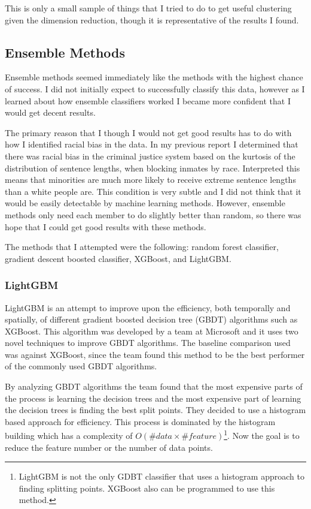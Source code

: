 \documentclass[11pt]{article}
\begin{document}
    
    This is only a small sample of things that I tried to do to get useful
clustering given the dimension reduction, though it is representative
of the results I found.

    \hypertarget{ensemble-methods}{%
\subsection{Ensemble Methods}\label{ensemble-methods}}

Ensemble methods seemed immediately like the methods with the highest chance of success. I did not initially expect to successfully classify this data, however as I learned about how ensemble classifiers worked I became more confident that I would get decent results.

The primary reason that I though I would not get good results has to do
with how I identified racial bias in the data. In my previous report I
determined that there was racial bias in the criminal justice system
based on the kurtosis of the distribution of sentence lengths, when
blocking inmates by race. Interpreted this means that minorities are much
more likely to receive extreme sentence lengths than a white people
are. This condition is very subtle and I did not think that it would be
easily detectable by machine learning methods. However, ensemble methods
only need each member to do slightly better than random, so there was
hope that I could get good results with these methods.

The methods that I attempted were the following: random forest
classifier, gradient descent boosted classifier, XGBoost, and LightGBM.

    \hypertarget{lightgbm}{%
\subsubsection{LightGBM}\label{lightgbm}}

LightGBM is an attempt to improve upon the efficiency, both temporally
and spatially, of different gradient boosted decision tree (GBDT)
algorithms such as XGBoost. This algorithm was developed by a team at
Microsoft and it uses two novel techniques to improve GBDT algorithms.
The baseline comparison used was against XGBoost, since the team found
this method to be the best performer of the commonly used GBDT
algorithms\cite{lgbm}.

By analyzing GBDT algorithms the team found that the most expensive
parts of the process is learning the decision trees and the most
expensive part of learning the decision trees is finding the best split
points. They decided to use a histogram based approach for efficiency.
This process is dominated by the histogram building which has a
complexity of $O(\#data \times \#feature)$\footnote{LightGBM is not the only GDBT classifier that uses a histogram approach to finding splitting points. XGBoost also can be programmed to use this method.}. Now the goal is to reduce
the feature number or the number of data points.
\end{document}
